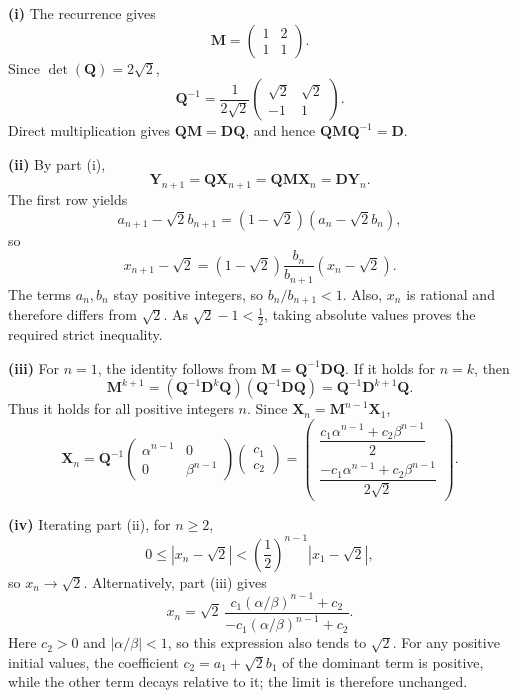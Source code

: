 \begin{solution}[Brief]
\textbf{(i)} The recurrence gives
\[
\mathbf{M}=\begin{pmatrix}1&2\\1&1\end{pmatrix}.
\]
Since $\det(\mathbf{Q})=2\sqrt{2}$,
\[
\mathbf{Q}^{-1}=\frac{1}{2\sqrt{2}}
\begin{pmatrix}\sqrt{2}&\sqrt{2}\\-1&1\end{pmatrix}.
\]
Direct multiplication gives $\mathbf{Q}\mathbf{M}=\mathbf{D}\mathbf{Q}$, and hence $\mathbf{Q}\mathbf{M}\mathbf{Q}^{-1}=\mathbf{D}$.

\textbf{(ii)} By part (i),
\[
\mathbf{Y}_{n+1}
=\mathbf{Q}\mathbf{X}_{n+1}
=\mathbf{Q}\mathbf{M}\mathbf{X}_n
=\mathbf{D}\mathbf{Y}_n.
\]
The first row yields
\[
a_{n+1}-\sqrt{2}b_{n+1}
=(1-\sqrt{2})(a_n-\sqrt{2}b_n),
\]
so
\[
x_{n+1}-\sqrt{2}
=(1-\sqrt{2})\frac{b_n}{b_{n+1}}(x_n-\sqrt{2}).
\]
The terms $a_n,b_n$ stay positive integers, so $b_n/b_{n+1}<1$. Also, $x_n$ is rational and therefore differs from $\sqrt{2}$. As $\sqrt{2}-1<\frac12$, taking absolute values proves the required strict inequality.

\textbf{(iii)} For $n=1$, the identity follows from $\mathbf{M}=\mathbf{Q}^{-1}\mathbf{D}\mathbf{Q}$. If it holds for $n=k$, then
\[
\mathbf{M}^{k+1}
=(\mathbf{Q}^{-1}\mathbf{D}^k\mathbf{Q})
(\mathbf{Q}^{-1}\mathbf{D}\mathbf{Q})
=\mathbf{Q}^{-1}\mathbf{D}^{k+1}\mathbf{Q}.
\]
Thus it holds for all positive integers $n$. Since $\mathbf{X}_n=\mathbf{M}^{n-1}\mathbf{X}_1$,
\[
\mathbf{X}_n
=\mathbf{Q}^{-1}
\begin{pmatrix}\alpha^{n-1}&0\\0&\beta^{n-1}\end{pmatrix}
\begin{pmatrix}c_1\\c_2\end{pmatrix}
=
\begin{pmatrix}
\dfrac{c_1\alpha^{n-1}+c_2\beta^{n-1}}{2}\\[2mm]
\dfrac{-c_1\alpha^{n-1}+c_2\beta^{n-1}}{2\sqrt{2}}
\end{pmatrix}.
\]

\textbf{(iv)} Iterating part (ii), for $n\ge2$,
\[
0\le\left|x_n-\sqrt{2}\right|
<\left(\frac12\right)^{n-1}\left|x_1-\sqrt{2}\right|,
\]
so $x_n\to\sqrt{2}$. Alternatively, part (iii) gives
\[
x_n=\sqrt{2}\,
\frac{c_1(\alpha/\beta)^{n-1}+c_2}
{-c_1(\alpha/\beta)^{n-1}+c_2}.
\]
Here $c_2>0$ and $|\alpha/\beta|<1$, so this expression also tends to $\sqrt{2}$. For any positive initial values, the coefficient $c_2=a_1+\sqrt{2}b_1$ of the dominant term is positive, while the other term decays relative to it; the limit is therefore unchanged.
\end{solution}


